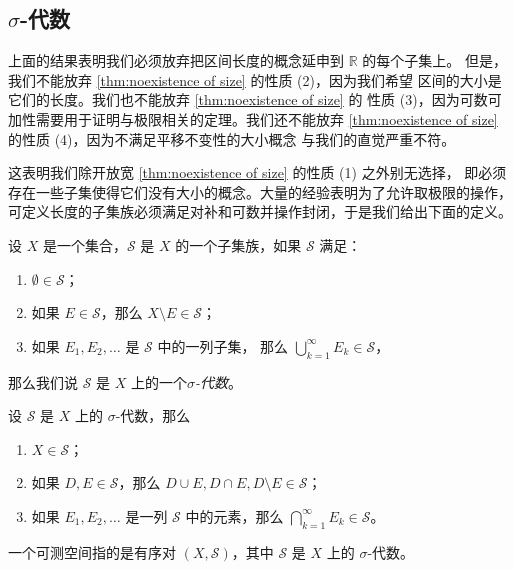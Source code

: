 \documentclass[fontset=none]{Notes}
\begin{document}
\subsection{$\sigma$-代数}

上面的结果表明我们必须放弃把区间长度的概念延申到 $\mathbb{R}$ 的每个子集上。
但是，我们不能放弃 \autoref{thm:noexistence of size} 的性质 (2)，因为我们希望
区间的大小是它们的长度。我们也不能放弃 \autoref{thm:noexistence of size} 的
性质 (3)，因为可数可加性需要用于证明与极限相关的定理。我们还不能放弃
\autoref{thm:noexistence of size} 的性质 (4)，因为不满足平移不变性的大小概念
与我们的直觉严重不符。

这表明我们除开放宽 \autoref{thm:noexistence of size} 的性质 (1) 之外别无选择，
即必须存在一些子集使得它们没有大小的概念。大量的经验表明为了允许取极限的操作，
可定义长度的子集族必须满足对补和可数并操作封闭，于是我们给出下面的定义。

\begin{definition}
  设 $X$ 是一个集合，$\mathcal{S}$ 是 $X$ 的一个子集族，如果 $\mathcal{S}$
  满足：
  \begin{enumerate}
    \item $\emptyset\in \mathcal{S}$；
    \item 如果 $E\in \mathcal{S}$，那么 $X\setminus E\in \mathcal{S}$；
    \item 如果 $E_1,E_2,\dots$ 是 $\mathcal{S}$ 中的一列子集，
    那么 $\bigcup_{k=1}^\infty E_k\in \mathcal{S}$，
  \end{enumerate}
  那么我们说 $\mathcal{S}$ 是 $X$ 上的一个\emph{$\sigma$-代数}。
\end{definition}

\begin{proposition}
  设 $\mathcal{S}$ 是 $X$ 上的 $\sigma$-代数，那么
  \begin{enumerate}
    \item $X\in \mathcal{S}$；
    \item 如果 $D,E\in \mathcal{S}$，那么 $D\cup E,D\cap E,D \setminus E\in \mathcal{S}$；
    \item 如果 $E_1,E_2,\dots$ 是一列 $\mathcal{S}$ 中的元素，那么 $\bigcap_{k=1}^\infty E_k\in \mathcal{S}$。
  \end{enumerate}
\end{proposition}


\begin{definition}
  一个可测空间指的是有序对 $(X,\mathcal{S})$，其中 $\mathcal{S}$ 是 $X$
  上的 $\sigma$-代数。
\end{definition}
\end{document}
